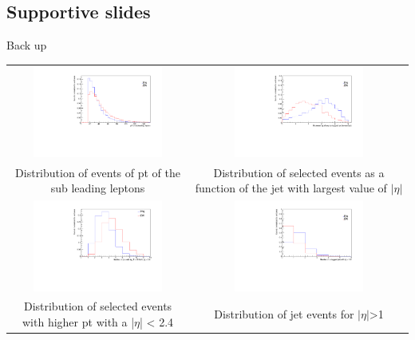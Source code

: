\documentclass[11pt]{beamer}
\newcommand\Fontvi{\fontsize{4}{7.2}\selectfont}
\begin{document}
\begin{frame}
\section{Supportive slides}
\huge{Back up}
\end{frame}

{\nologo
	\begin{frame}
		\Fontvi
		\begin{center}
			\begin{tabular}{cc}
				\includegraphics[width=5.5cm,height=3cm]{figures/distributions/compare_variables-pt-sub} &
				\includegraphics[width=5.5cm,height=3cm]{figures/distributions/compare_variables-abs-pj-eta}\\ 
				{Distribution of events of pt of the sub leading leptons} &{Distribution of selected events as a function of the jet with largest value of $|\eta|$}\\
				\includegraphics[width=5.5cm,height=3cm]{figures/distributions/compare_variablescompare_variables-ncj24}&
				\includegraphics[width=5.5cm,height=3cm]{figures/distributions/compare_variables-nfj}\\		
				{Distribution of selected events with higher pt with a |$\eta$| < 2.4 } & {Distribution of jet events for $|\eta|$>1 } \\
			\end{tabular}
		\end{center}
	\end{frame}
}
\end{document}
